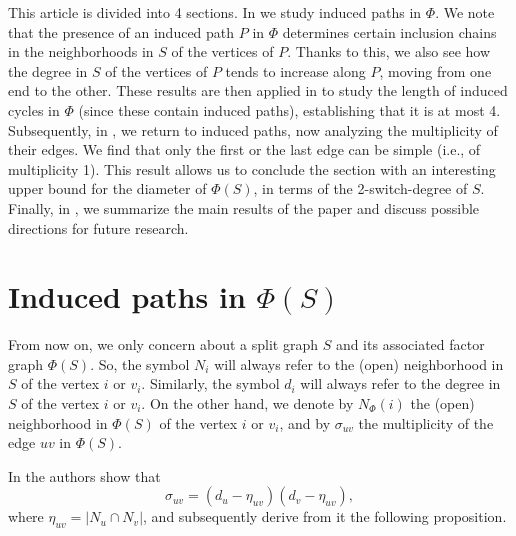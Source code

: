 \documentclass[11pt]{elsarticle}
\begin{document}
This article is divided into 4 sections. In  we study induced paths in $\Phi$. We note that the presence of an induced path $P$ in $\Phi$ determines certain inclusion chains in the neighborhoods in $S$ of the vertices of $P$. Thanks to this, we also see how the degree in $S$ of the vertices of $P$ tends to increase along $P$, moving from one end to the other. These results are then applied in  to study the length of induced cycles in $\Phi$ (since these contain induced paths), establishing that it is at most 4. Subsequently, in , we return to induced paths, now analyzing the multiplicity of their edges. We find that only the first or the last edge can be simple (i.e., of multiplicity 1). This result allows us to conclude the section with an interesting upper bound for the diameter of $\Phi(S)$, in terms of the 2-switch-degree of $S$. Finally, in , we summarize the main results of the paper and discuss possible directions for future research.


\section{Induced paths in $\Phi(S)$}
\label{sec:ind_paths_Phi}

From now on, we only concern about a split graph $S$ and its associated factor graph $\Phi(S)$. So, the symbol $N_i$ will always refer to the (open) neighborhood in $S$ of the vertex $i$ or $v_i$. Similarly, the symbol $d_i$ will always refer to the degree in $S$ of the vertex $i$ or $v_i$. On the other hand, we denote by $N_{\Phi}(i)$ the (open) neighborhood in $\Phi(S)$ of the vertex $i$ or $v_i$, and by $\sigma_{uv}$ the multiplicity of the edge $uv$ in $\Phi(S)$. 

In \cite{pastine2025simple} the authors show that 
\[ \sigma_{uv}=(d_u-\eta_{uv})(d_v-\eta_{uv}), \]
where $\eta_{uv}=|N_u\cap N_v|$, and subsequently derive from it the following proposition. 
\end{document}
